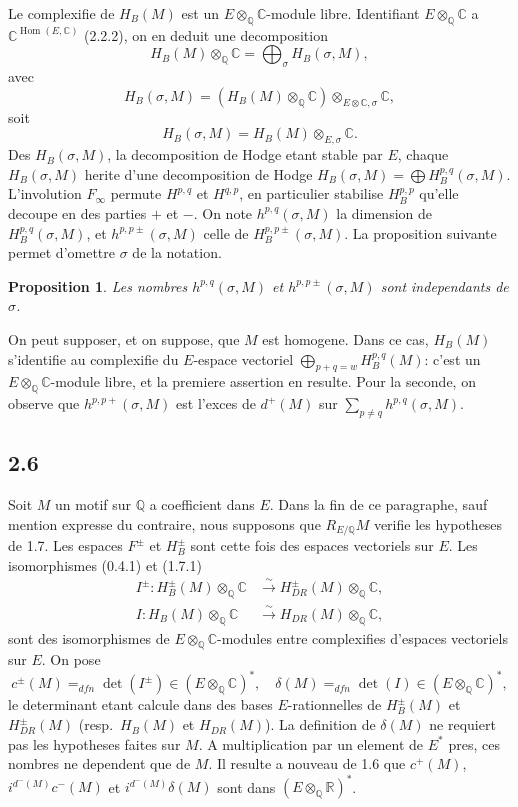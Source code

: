 \documentclass[12pt,a4paper]{article}
\theoremstyle{plain}
\newtheorem{proposition}[theorem]{Proposition}
\theoremstyle{definition}
\theoremstyle{remark}
\DeclareMathOperator{\Hom}{Hom}
\newcommand{\Q}{\mathbb{Q}}
\newcommand{\R}{\mathbb{R}}
\newcommand{\C}{\mathbb{C}}
\begin{document}
Le complexifie de $H_B(M)$ est un $E \otimes_\Q \C$-module libre. Identifiant
$E \otimes_\Q \C$ a $\C^{\Hom(E,\C)}$ (2.2.2), on en deduit une decomposition
\[
H_B(M) \otimes_\Q \C = \bigoplus_\sigma H_B(\sigma, M),
\]
avec
\[
H_B(\sigma, M) = (H_B(M) \otimes_\Q \C) \otimes_{E \otimes \C, \sigma} \C,
\]
soit
\[
H_B(\sigma, M) = H_B(M) \otimes_{E, \sigma} \C.
\]
Des $H_B(\sigma, M)$, la decomposition de Hodge etant stable par $E$, chaque
$H_B(\sigma, M)$ herite d'une decomposition de Hodge
$H_B(\sigma, M) = \bigoplus H^{p,q}_B(\sigma, M)$. L'involution $F_\infty$ permute $H^{p,q}$ et $H^{q,p}$,
en particulier stabilise $H^{p,p}_B$ qu'elle decoupe en des parties $+$ et $-$. On note
$h^{p,q}(\sigma, M)$ la dimension de $H^{p,q}_B(\sigma, M)$, et $h^{p,p\pm}(\sigma, M)$ celle de
$H^{p,p\pm}_B(\sigma, M)$. La proposition suivante permet d'omettre $\sigma$ de la notation.

\begin{proposition}\label{prop:2.5}
Les nombres $h^{p,q}(\sigma, M)$ et $h^{p,p\pm}(\sigma, M)$ sont independants de $\sigma$.
\end{proposition}

On peut supposer, et on suppose, que $M$ est homogene. Dans ce cas, $H_B(M)$
s'identifie au complexifie du $E$-espace vectoriel $\bigoplus_{p+q=w} H^{p,q}_B(M)$: c'est un
$E \otimes_\Q \C$-module libre, et la premiere assertion en resulte. Pour la seconde, on
observe que $h^{p,p+}(\sigma, M)$ est l'exces de $d^+(M)$ sur $\sum_{p \neq q} h^{p,q}(\sigma, M)$.

\subsection*{2.6}

Soit $M$ un motif sur $\Q$ a coefficient dans $E$. Dans la fin de ce paragraphe, sauf
mention expresse du contraire, nous supposons que $R_{E/\Q} M$ verifie les hypotheses
de 1.7. Les espaces $F^\pm$ et $H^\pm_B$ sont cette fois des espaces vectoriels sur $E$. Les
isomorphismes (0.4.1) et (1.7.1)
\begin{align}
I^\pm: H^\pm_B(M) \otimes_\Q \C &\xrightarrow{\sim} H^\pm_{DR}(M) \otimes_\Q \C, \label{eq:2.6.1}\\
I: H_B(M) \otimes_\Q \C &\xrightarrow{\sim} H_{DR}(M) \otimes_\Q \C, \label{eq:2.6.2}
\end{align}
sont des isomorphismes de $E \otimes_\Q \C$-modules entre complexifies d'espaces vectoriels
sur $E$. On pose
\[
c^\pm(M) =_{dfn} \det(I^\pm) \in (E \otimes_\Q \C)^*, \quad \delta(M) =_{dfn} \det(I) \in (E \otimes_\Q \C)^*,
\]
le determinant etant calcule dans des bases $E$-rationnelles de $H^\pm_B(M)$ et
$H^\pm_{DR}(M)$ (resp.~$H_B(M)$ et $H_{DR}(M)$). La definition de $\delta(M)$ ne requiert pas les
hypotheses faites sur $M$. A multiplication par un element de $E^*$ pres, ces nombres ne
dependent que de $M$. Il resulte a nouveau de 1.6 que $c^+(M)$, $i^{d^-(M)} c^-(M)$ et
$i^{d^-(M)} \delta(M)$ sont dans $(E \otimes_\Q \R)^*$.
\end{document}
